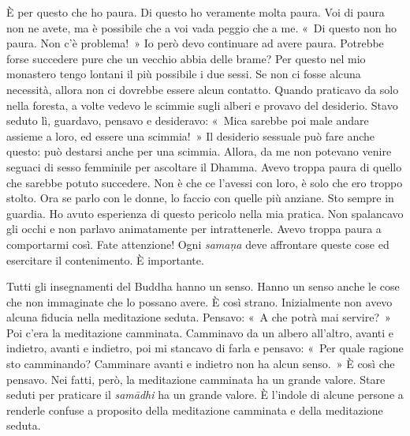 È per questo che ho paura. Di questo ho veramente molta paura. Voi di
paura non ne avete, ma è possibile che a voi vada peggio che a me. «~Di
questo non ho paura. Non c'è problema!~» Io però devo continuare ad
avere paura. Potrebbe forse succedere pure che un vecchio abbia delle
brame? Per questo nel mio monastero tengo lontani il più possibile i due
sessi. Se non ci fosse alcuna necessità, allora non ci dovrebbe essere
alcun contatto. Quando praticavo da solo nella foresta, a volte vedevo
le scimmie sugli alberi e provavo del desiderio. Stavo seduto lì,
guardavo, pensavo e desideravo: «~Mica sarebbe poi male andare assieme a
loro, ed essere una scimmia!~» Il desiderio sessuale può fare anche
questo: può destarsi anche per una scimmia. Allora, da me non potevano
venire seguaci di sesso femminile per ascoltare il Dhamma. Avevo troppa
paura di quello che sarebbe potuto succedere. Non è che ce l'avessi con
loro, è solo che ero troppo stolto. Ora se parlo con le donne, lo faccio
con quelle più anziane. Sto sempre in guardia. Ho avuto esperienza di
questo pericolo nella mia pratica. Non spalancavo gli occhi e non
parlavo animatamente per intrattenerle. Avevo troppa paura a comportarmi
così. Fate attenzione! Ogni \emph{samaṇa} deve affrontare queste cose ed
esercitare il contenimento. È importante.

Tutti gli insegnamenti del Buddha hanno un senso. Hanno un senso anche
le cose che non immaginate che lo possano avere. È così strano.
Inizialmente non avevo alcuna fiducia nella meditazione seduta. Pensavo:
«~A che potrà mai servire?~» Poi c'era la meditazione camminata.
Camminavo da un albero all'altro, avanti e indietro, avanti e indietro,
poi mi stancavo di farla e pensavo: «~Per quale ragione sto camminando?
Camminare avanti e indietro non ha alcun senso.~» È così che pensavo.
Nei fatti, però, la meditazione camminata ha un grande valore. Stare
seduti per praticare il \emph{samādhi} ha un grande valore. È l'indole
di alcune persone a renderle confuse a proposito della meditazione
camminata e della meditazione seduta.

